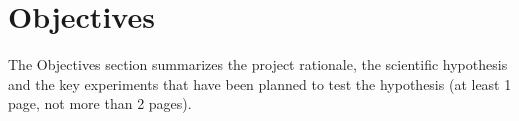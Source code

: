 \graphicspath{{chapters/03_objectives/}}
\chapter{Objectives}

The Objectives section summarizes the project rationale, the scientific hypothesis and the
key experiments that have been planned to test the hypothesis (at least 1 page, not more than
2 pages).